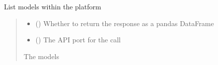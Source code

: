\documentclass[letterpaper,10pt,english]{sphinxmanual}
\begin{document}
\begin{fulllineitems}
\begin{fulllineitems}
\label{\detokenize{aisquared.platform:aisquared.platform.AISquaredPlatformClient.AISquaredPlatformClient.list_models}}
\pysigstartsignatures
{}
\pysigstopsignatures
\sphinxAtStartPar
List models within the platform

\begin{sphinxVerbatim}[commandchars=\\\{\}]
 
  
\end{sphinxVerbatim}
\begin{quote}\begin{description}
\begin{itemize}
\item {} 
\sphinxAtStartPar
{} (\sphinxstyleliteralemphasis{\sphinxupquote{ (}}\sphinxstyleliteralemphasis{\sphinxupquote{)}}) \textendash{} Whether to return the response as a pandas DataFrame

\item {} 
\sphinxAtStartPar
{} (\sphinxstyleliteralemphasis{\sphinxupquote{ (}}\sphinxstyleliteralemphasis{\sphinxupquote{)}}) \textendash{} The API port for the call

\end{itemize}

\sphinxAtStartPar
{} \textendash{} The models


\end{description}
\end{quote}
\end{fulllineitems}
\end{fulllineitems}
\end{document}
